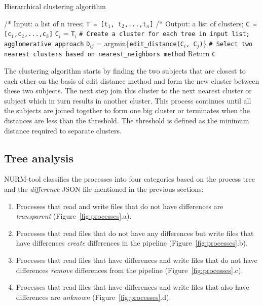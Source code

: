 \documentclass[a4paper,num-refs]{oup-contemporary}
\begin{document}
\begin{algorithm}[h!]
\caption{Hierarchical clustering algorithm}
\label{algo:hclustering}
\begin{algorithmic}

  \State /* Input: a list of n trees; \texttt{T = [t${_1}$, t${_2}$,...,t${_n}$]}
  \State /* Output: a list of clusters; \texttt{C = [c${_1}$,c${_2}$,...,c${_k}$]}
  \State \texttt{C${_i}$} = \texttt{T${_i}$} 
  \State \texttt{\# Create a cluster for each tree in input list; \texttt{agglomerative approach}}
  \EndFor
  \State \texttt{D${_{ij}}$} = argmin\{\texttt{edit\_distance(C${_i}$, C${_j}$)}\}
  \State \texttt{\# Select two nearest clusters based on \texttt{nearest\_neighbors} method}
  \EndFor
  \EndFor
  \State Return \texttt{C}
  \EndIf
  \EndWhile
\end{algorithmic}
\end{algorithm}

The clustering algorithm starts by finding the two subjects that are 
closest to each other on the basis of edit distance method and form the 
new cluster between these two subjects. The next step join this 
cluster to the next nearest cluster or subject which in turn results in 
another cluster. This process continues until all the subjects are 
joined together to form one big cluster or terminates when the distances 
are less than the threshold. The threshold is defined as the minimum 
distance required to separate clusters. 


\subsection{Tree analysis}

NURM-tool classifies the processes into four 
categories based on the process tree and the \textit{difference} JSON file 
mentioned in the previous sections:
\begin{enumerate}
\item Processes that read and write files that do not have differences 
are \emph{transparent} (Figure~\ref{fig:processes}.a).
\item Processes that read files 
that do not have any differences but write files that have differences 
\emph{create} differences in the pipeline (Figure~\ref{fig:processes}.b).
\item Processes that read files 
that have differences and write files that do not have differences \emph{remove} 
differences from the pipeline (Figure~\ref{fig:processes}.c).
\item Processes that read files that have differences and write files that 
also have differences are 
\emph{unknown} (Figure~\ref{fig:processes}.d).
\end{enumerate}
\end{document}
